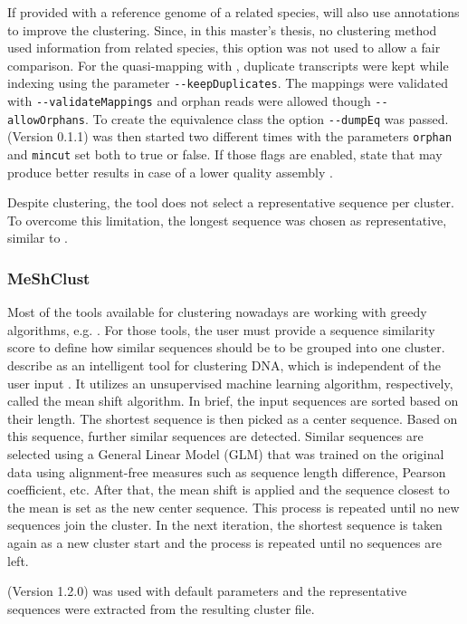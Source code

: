 \documentclass[12pt,a4paper,english]{article}
\begin{document}
	If provided with a reference genome of a related species, \grouper will also use annotations to improve the clustering. Since, in this master's thesis, no clustering method used information from related species, this option was not used to allow a fair comparison.
	For the quasi-mapping with \salmon, duplicate transcripts were kept while indexing using the parameter \texttt{-{}-keepDuplicates}. The mappings were validated with \texttt{-{}-validateMappings} and orphan reads were allowed though \texttt{-{}-allowOrphans}. To create the equivalence class the option \texttt{-{}-dumpEq} was passed.
	\grouper (Version 0.1.1) was then started two different times with the parameters \texttt{orphan} and \texttt{mincut} set both to true or false. If those flags are enabled, \citeauthor{Grouper:18} state that \grouper may produce better results in case of a lower quality assembly \citep{Grouper:18}.
	
	Despite clustering, the tool does not select a representative sequence per cluster. To overcome this limitation, the longest sequence was chosen as representative, similar to \cdhit.

\subsubsection*{MeShClust}
    Most of the tools available for clustering nowadays are working with greedy algorithms, e.g. \cdhit. For those tools, the user must provide a sequence similarity score to define how similar sequences should be to be grouped into one cluster. \citeauthor{meshclust:18} describe \mclust as an intelligent tool for clustering DNA, which is independent of the user input \citep{meshclust:18}. It utilizes an unsupervised machine learning algorithm, respectively, called the mean shift algorithm.
	In brief, the input sequences are sorted based on their length. The shortest sequence is then picked as a center sequence. Based on this sequence, further similar sequences are detected. Similar sequences are selected using a General Linear Model (GLM) that was trained on the original data using alignment-free measures such as sequence length difference, Pearson coefficient, etc. After that, the mean shift is applied and the sequence closest to the mean is set as the new center sequence. This process is repeated until no new sequences join the cluster. In the next iteration, the shortest sequence is taken again as a new cluster start and the process is repeated until no sequences are left.

	\mclust (Version 1.2.0) was used with default parameters and the representative sequences were extracted from the resulting cluster file.
\end{document}
